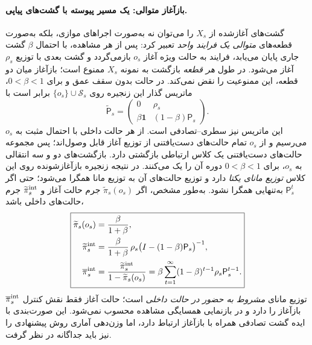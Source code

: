 \paragraph{بازآغاز متوالی: یک مسیر پیوسته با گشت‌های پیاپی.}
گشت‌های آغازشده از $X_s$ را می‌توان
نه به‌صورت اجراهای موازی،
بلکه به‌صورت قطعه‌های
\emph{متوالی یک فرایند واحد}
تعبیر کرد: پس از هر مشاهده،
با احتمال $\beta$ گشت جاری
پایان می‌یابد، فرایند به
حالت ویژه آغاز $o_s$
بازمی‌گردد و گشت بعدی
با توزیع $\rho_s$ آغاز می‌شود.
در طول \emph{هر قطعه} بازگشت
به نمونه $X_s$ ممنوع است؛
بازآغاز میان دو قطعه،
این ممنوعیت را نقض نمی‌کند.
در حالت بدون سقف عمق و
برای $0<\beta<1$،
ماتریس گذار این زنجیره
روی $\{o_s\}\cup\mathcal S_s$
برابر است با
\begin{equation}\label{eq:ch3-sequential-restart-matrix}
\boxed{
\widetilde{\mathsf P}_s=
\begin{pmatrix}
0&\rho_s\\
\beta\mathbf1&(1-\beta)\mathsf P_s
\end{pmatrix}.
}
\end{equation}
این ماتریس نیز سطری--تصادفی
است. از هر حالت داخلی با
احتمال مثبت به $o_s$
می‌رسیم و از $o_s$
تمام حالت‌های دست‌یافتنی
از توزیع آغاز قابل وصول‌اند؛
پس مجموعه حالت‌های
دست‌یافتنی یک کلاس
ارتباطی بازگشتی دارد.
بازگشت‌های دو و سه
انتقالی به $o_s$،
برای $0<\beta<1$
دوره آن را یک می‌کنند.
در نتیجه زنجیره
بازآغازشونده روی
این کلاس \emph{توزیع
مانای یکتا} دارد
و توزیع حالت‌های آن
به توزیع مانا همگرا
می‌شود؛ حتی اگر
$\mathsf P_s^t$
به‌تنهایی همگرا نشود.
به‌طور مشخص، اگر
$\widetilde\pi_s(o_s)$
جرم حالت آغاز و
$\widetilde\pi_s^{\rm int}$
جرم حالت‌های داخلی باشد،
\begin{equation}\label{eq:ch3-sequential-restart-stationary}
\boxed{
\begin{aligned}
\widetilde\pi_s(o_s)
&=\frac{\beta}{1+\beta},\\
\widetilde\pi_s^{\rm int}
&=\frac{\beta}{1+\beta}\,
\rho_s\bigl(I-(1-\beta)\mathsf P_s\bigr)^{-1},\\
\overline\pi_s^{\rm int}
&=\frac{\widetilde\pi_s^{\rm int}}
{1-\widetilde\pi_s(o_s)}
=\beta\sum_{t=1}^{\infty}
(1-\beta)^{t-1}\rho_s\mathsf P_s^{t-1}.
\end{aligned}
}
\end{equation}
$ \overline\pi_s^{\rm int} $
توزیع مانای \emph{مشروط
به حضور در حالت داخلی}
است؛ حالت آغاز فقط
نقش کنترل بازآغاز
را دارد و در
بازنمایی همسایگی
مشاهده محسوب نمی‌شود.
این صورت‌بندی
با ایده گشت تصادفی
همراه با بازآغاز
ارتباط دارد، اما
وزن‌دهی آماری روش
پیشنهادی را نیز باید
جداگانه در نظر گرفت.

